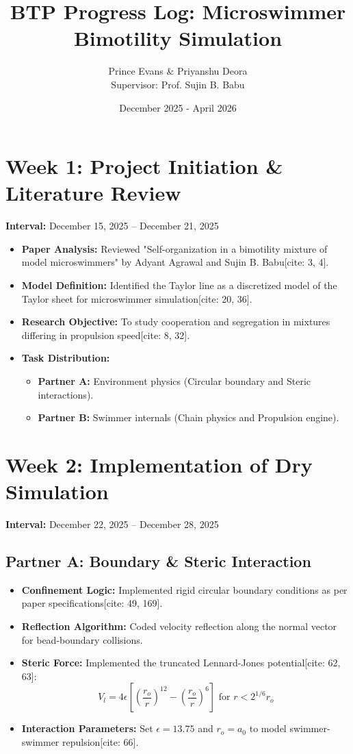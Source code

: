\documentclass[11pt]{article}
\title{BTP Progress Log: Microswimmer Bimotility Simulation}
\author{Prince Evans  \& Priyanshu Deora \\ \small Supervisor: Prof. Sujin B. Babu}
\date{December 2025 - April 2026}
\begin{document}
\maketitle

\section*{Week 1: Project Initiation \& Literature Review}
\textbf{Interval:} December 15, 2025 -- December 21, 2025

\begin{itemize}[noitemsep]
    \item \textbf{Paper Analysis:} Reviewed "Self-organization in a bimotility mixture of model microswimmers" by Adyant Agrawal and Sujin B. Babu[cite: 3, 4].
    \item \textbf{Model Definition:} Identified the Taylor line as a discretized model of the Taylor sheet for microswimmer simulation[cite: 20, 36].
    \item \textbf{Research Objective:} To study cooperation and segregation in mixtures differing in propulsion speed[cite: 8, 32].
    \item \textbf{Task Distribution:}
    \begin{itemize}
        \item \textbf{Partner A:} Environment physics (Circular boundary and Steric interactions).
        \item \textbf{Partner B:} Swimmer internals (Chain physics and Propulsion engine).
    \end{itemize}
\end{itemize}

\section*{Week 2: Implementation of Dry Simulation}
\textbf{Interval:} December 22, 2025 -- December 28, 2025

\subsection*{Partner A: Boundary \& Steric Interaction}
\begin{itemize}[noitemsep]
    \item \textbf{Confinement Logic:} Implemented rigid circular boundary conditions as per paper specifications[cite: 49, 169].
    \item \textbf{Reflection Algorithm:} Coded velocity reflection along the normal vector for bead-boundary collisions.
    \item \textbf{Steric Force:} Implemented the truncated Lennard-Jones potential[cite: 62, 63]:
    \[ V_{l}=4\epsilon\left[\left(\frac{r_{o}}{r}\right)^{12}-\left(\frac{r_{o}}{r}\right)^{6}\right] \text{ for  }  r < 2^{1/6}r_o \]
    \item \textbf{Interaction Parameters:} Set $\epsilon = 13.75$ and $r_o = a_0$ to model swimmer-swimmer repulsion[cite: 66].
\end{itemize}
\end{document}
